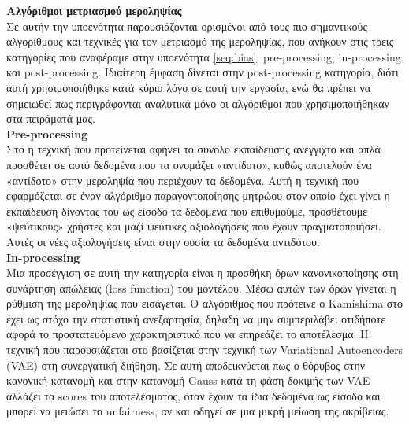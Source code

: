 \noindent \textbf{Αλγόριθμοι μετριασμού μεροληψίας}\\
Σε αυτήν την υποενότητα παρουσιάζονται ορισμένοι από τους πιο σημαντικούς αλγορίθμους και τεχνικές για τον μετριασμό της μεροληψίας, που ανήκουν στις τρεις κατηγορίες που αναφέραμε στην υποενότητα \ref{seq:bias}: pre-processing, in-processing και post-processing. Ιδιαίτερη έμφαση δίνεται στην post-processing κατηγορία, διότι αυτή χρησιμοποιήθηκε κατά κύριο λόγο σε αυτή την εργασία, ενώ θα πρέπει να σημειωθεί πως περιγράφονται αναλυτικά μόνο οι αλγόριθμοι που χρησιμοποιήθηκαν στα πειράματά μας.\\

\noindent \textbf{Pre-processing}\\
Στο \cite{rastegarpanahFightingFireFire2019} η τεχνική που προτείνεται αφήνει το σύνολο εκπαίδευσης ανέγγιχτο και απλά προσθέτει σε αυτό δεδομένα που τα ονομάζει «αντίδοτο», καθώς αποτελούν ένα «αντίδοτο» στην μεροληψία που περιέχουν τα δεδομένα. Αυτή η τεχνική που εφαρμόζεται σε έναν αλγόριθμο παραγοντοποίησης μητρώου στον οποίο έχει γίνει η εκπαίδευση δίνοντας του ως είσοδο τα δεδομένα που επιθυμούμε, προσθέτουμε «ψεύτικους» χρήστες και μαζί ψεύτικες αξιολογήσεις που έχουν πραγματοποιήσει. Αυτές οι νέες αξιολογήσεις είναι στην ουσία τα δεδομένα αντιδότου.\\


\noindent \textbf{In-processing}\\
Μια προσέγγιση σε αυτή την κατηγορία είναι η προσθήκη όρων κανονικοποίησης στη συνάρτηση απώλειας (loss function) του μοντέλου. Μέσω αυτών των όρων γίνεται η ρύθμιση της μεροληψίας που εισάγεται. O αλγόριθμος που πρότεινε ο Kamishima στο \cite{kamishimaRecommendationIndependence2018} έχει ως στόχο την στατιστική ανεξαρτησία, δηλαδή να μην συμπεριλάβει οτιδήποτε αφορά το προστατευόμενο χαρακτηριστικό που να επηρεάζει το αποτέλεσμα. Η τεχνική που παρουσιάζεται στο \cite{borgesEnhancingLongTerm2019} βασίζεται στην τεχνική των Variational Autoencoders (VAE) \cite{liangVariationalAutoencodersCollaborative2018a} στη συνεργατική διήθηση. Σε αυτή αποδεικνύεται πως ο θόρυβος στην κανονική κατανομή και στην κατανομή Gauss κατά τη φάση δοκιμής των VAE αλλάζει τα scores του αποτελέσματος, όταν έχουν τα ίδια δεδομένα ως είσοδο και μπορεί να μειώσει το unfairness, αν και οδηγεί σε μια μικρή μείωση της ακρίβειας. \\

